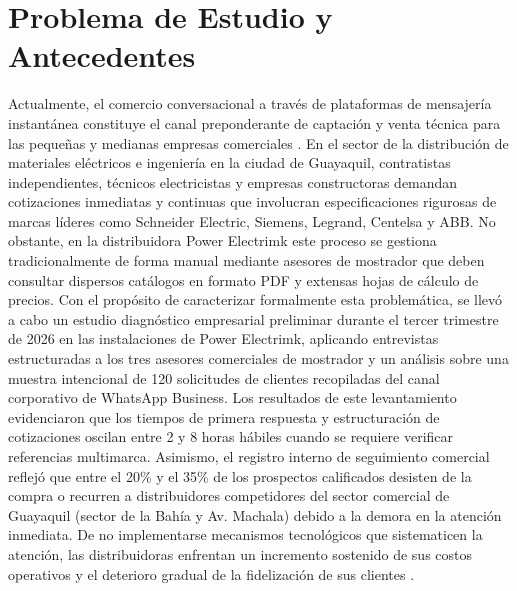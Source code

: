 \section{Problema de Estudio y Antecedentes}

Actualmente, el comercio conversacional a través de plataformas de mensajería instantánea constituye el canal preponderante de captación y venta técnica para las pequeñas y medianas empresas comerciales \parencite{adamopoulou2020chatbots,adam2021chatbots,folstad2020users,luo2019frontiers}. En el sector de la distribución de materiales eléctricos e ingeniería en la ciudad de Guayaquil, contratistas independientes, técnicos electricistas y empresas constructoras demandan cotizaciones inmediatas y continuas que involucran especificaciones rigurosas de marcas líderes como Schneider Electric, Siemens, Legrand, Centelsa y ABB. No obstante, en la distribuidora Power Electrimk este proceso se gestiona tradicionalmente de forma manual mediante asesores de mostrador que deben consultar dispersos catálogos en formato PDF y extensas hojas de cálculo de precios. Con el propósito de caracterizar formalmente esta problemática, se llevó a cabo un estudio diagnóstico empresarial preliminar durante el tercer trimestre de 2026 en las instalaciones de Power Electrimk, aplicando entrevistas estructuradas a los tres asesores comerciales de mostrador y un análisis sobre una muestra intencional de 120 solicitudes de clientes recopiladas del canal corporativo de WhatsApp Business. Los resultados de este levantamiento evidenciaron que los tiempos de primera respuesta y estructuración de cotizaciones oscilan entre 2 y 8 horas hábiles cuando se requiere verificar referencias multimarca. Asimismo, el registro interno de seguimiento comercial reflejó que entre el 20\% y el 35\% de los prospectos calificados desisten de la compra o recurren a distribuidores competidores del sector comercial de Guayaquil (sector de la Bahía y Av. Machala) debido a la demora en la atención inmediata. De no implementarse mecanismos tecnológicos que sistematicen la atención, las distribuidoras enfrentan un incremento sostenido de sus costos operativos y el deterioro gradual de la fidelización de sus clientes \parencite{Llerena-Izquierdo_Ayala-Carabajo_2022,llerena2025guia}.

